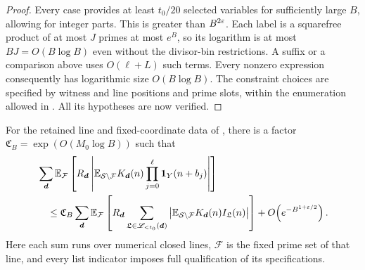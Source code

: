 \begin{proof}
Every case provides at least $t_0/20$ selected variables for sufficiently
large $B$, allowing for integer parts.  This is greater than
$B^{2\varepsilon}$.  Each label is a squarefree product of at most $J$ primes
at most $e^B$, so its logarithm is at most $BJ=O(B\log B)$ even without
the divisor-bin restrictions.  A suffix or a comparison above uses
$O(\ell+L)$ such terms.  Every nonzero expression consequently has
logarithmic size $O(B\log B)$.  The constraint choices are specified
by witness and line positions and prime slots, within the enumeration
allowed in .  All its hypotheses are now
verified.
\end{proof}

\begin{proposition}
\label{prop:cylinder-reduction}
For the retained line and fixed-coordinate data of
, there is a factor
$\mathfrak C_B=\exp(O(M_0\log B))$ such that
\begin{align}
 &\sum_{\boldsymbol d}\mathbb E_{\mathcal F}
   \left[R_{\boldsymbol d}
     \left|\mathbb E_{\mathcal S\setminus\mathcal F}
          K_{\boldsymbol d}(n)\prod_{j=0}^{\ell}\mathbf 1_Y(n+b_j)\right|\right]
       \notag\\
 &\quad\le \mathfrak C_B\sum_{\boldsymbol d}\mathbb E_{\mathcal F}
   \left[R_{\boldsymbol d}
     \sum_{\mathfrak L\in\mathscr L_{<t_0}(\boldsymbol d)}
       \left|\mathbb E_{\mathcal S\setminus\mathcal F}
                      K_{\boldsymbol d}(n)I_{\mathfrak L}(n)\right|\right]
       +O\!\left(e^{-B^{1+\varepsilon/2}}\right).
       \label{eq:cylinder-reduction}
\end{align}
Here each sum runs over numerical closed lines, $\mathcal F$ is the
fixed prime set of that line, and every list indicator imposes full
qualification of its specifications.
\end{proposition}


